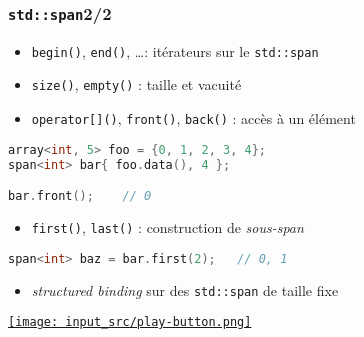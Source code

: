\documentclass[C++.tex]{subfiles}
\begin{document}
\begin{frame}[fragile]
	\frametitle{\lstinline|std::span|\titlehfill{}2/2}
	\begin{itemize}
		\item \lstinline|begin()|, \lstinline|end()|, \ldots : itérateurs sur le \lstinline|std::span|
		\item \lstinline|size()|, \lstinline|empty()| : taille et vacuité
		\item \lstinline|operator[]()|, \lstinline|front()|, \lstinline|back()| : accès à un élément
	\end{itemize}

	\begin{lstlisting}[language=C++]
array<int, 5> foo = {0, 1, 2, 3, 4};
span<int> bar{ foo.data(), 4 };

bar.front();    // 0\end{lstlisting}

	\begin{itemize}
		\item \lstinline|first()|, \lstinline|last()| : construction de \textit{sous-span}
	\end{itemize}

		\begin{lstlisting}[language=C++]
span<int> baz = bar.first(2);   // 0, 1\end{lstlisting}

	\begin{itemize}
		\item \textit{structured binding} sur des \lstinline|std::span| de taille fixe
	\end{itemize}

	\hfill
	\href{https://godbolt.org/#g:!((g:!((g:!((h:codeEditor,i:(filename:'1',fontScale:14,fontUsePx:'0',j:1,lang:c%2B%2B,selection:(endColumn:1,endLineNumber:21,positionColumn:1,positionLineNumber:21,selectionStartColumn:1,selectionStartLineNumber:21,startColumn:1,startLineNumber:21),source:'%23include+%3Carray%3E%0A%23include+%3Cspan%3E%0A%23include+%3Ciostream%3E%0A%0Aint+main()%0A%7B%0A++std::array%3Cint,+5%3E+foo+%3D+%7B7,+12,+28,+3,+9%7D%3B%0A++std::span%3Cint%3E+bar(foo.data(),+3)%3B%0A%0A++std::cout+%3C%3C+bar.size()+%3C%3C+%22%5Cn%22%3B%0A++std::cout+%3C%3C+bar.front()+%3C%3C+%22%5Cn%22%3B+%0A++std::cout+%3C%3C+bar%5B2%5D+%3C%3C+%22%5Cn%22%3B+%0A%0A++std::span%3Cint%3E+baz+%3D+bar.first(2)%3B%0A++for(const+auto+i+:+baz)%0A++%7B%0A++++std::cout+%3C%3C+i+%3C%3C+%22+%22%3B%0A++%7D%0A++std::cout+%3C%3C+%22%5Cn%22%3B%0A%7D%0A'),l:'5',n:'0',o:'C%2B%2B+source+%231',t:'0')),k:50,l:'4',n:'0',o:'',s:0,t:'0'),(g:!((h:executor,i:(argsPanelShown:'1',compilationPanelShown:'0',compiler:g112,compilerOutShown:'0',execArgs:'',execStdin:'',fontScale:14,fontUsePx:'0',j:1,lang:c%2B%2B,libs:!((name:boost,ver:'175')),options:'-std%3Dc%2B%2B20',source:1,stdinPanelShown:'1',tree:'1',wrap:'0'),l:'5',n:'0',o:'Executor+x86-64+gcc+11.2+(C%2B%2B,+Editor+%231)',t:'0')),header:(),k:50,l:'4',n:'0',o:'',s:0,t:'0')),l:'2',n:'0',o:'',t:'0')),version:4}{\texttt{[image: input\_src/play-button.png]}}
\end{frame}
\end{document}
